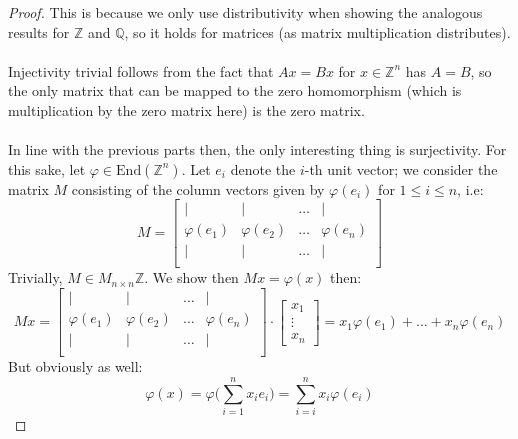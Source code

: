 \documentclass[12pt]{article}
\newenvironment{ex}[2][Exercise]{\begin{trivlist}
\item[\hskip \labelsep {\bfseries #1}\hskip \labelsep {\bfseries #2.}]}{\end{trivlist}}
\begin{document}
\begin{ex}{3}
\begin{enumerate}[label=(\alph*)]
\begin{proof}
        This is because we only use distributivity when showing the analogous results for $\mathbb{Z}$ and $\mathbb{Q}$, so it holds for matrices (as matrix multiplication distributes). \\ \\
        Injectivity trivial follows from the fact that $Ax = Bx$ for $x \in \mathbb{Z}^n$ has $A = B$, so the only matrix that can be mapped to the zero homomorphism (which is multiplication by the zero matrix here) is the zero matrix. \\ \\
        In line with the previous parts then, the only interesting thing is surjectivity. For this sake, let $\varphi \in \text{End}{(\mathbb{Z}^n)}$. Let $e_i$ denote the $i$-th unit vector; we consider the matrix $M$ consisting of the column vectors given by $\varphi(e_i)$ for $1 \leq i \leq n$, i.e:
        \begin{equation} M = 
            \begin{bmatrix}
                \vert & \vert & \hdots & \vert \\
                \varphi(e_1) & \varphi(e_2) & \hdots & \varphi(e_n) \\
                \vert & \vert & \hdots & \vert \\
            \end{bmatrix}
        \end{equation}
        Trivially, $M \in M_{n \times n}{\mathbb{Z}}$. We show then $Mx = \varphi(x)$ then:
        \begin{equation}
            Mx = \begin{bmatrix}
                \vert & \vert & \hdots & \vert \\
                \varphi(e_1) & \varphi(e_2) & \hdots & \varphi(e_n) \\
                \vert & \vert & \hdots & \vert \\
            \end{bmatrix} \cdot \begin{bmatrix}
                x_1 \\
                \vdots \\
                x_n
            \end{bmatrix} = x_1\varphi(e_1) + ... + x_n\varphi(e_n) 
        \end{equation}
        But obviously as well:
        \begin{equation}
            \varphi(x) = \varphi \Big (\sum_{i = 1}^n x_ie_i \Big ) = \sum_{i = i}^n x_i\varphi(e_i)

\end{equation}
\end{proof}
\end{enumerate}
\end{ex}
\end{document}
